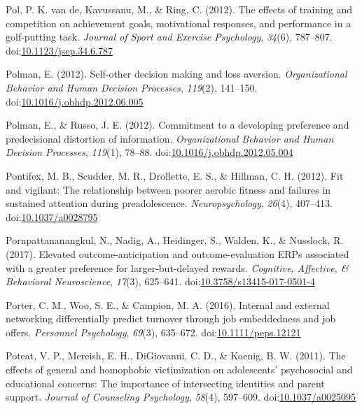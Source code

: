 \documentclass[english,man]{apa6}
\theoremstyle{definition}
\theoremstyle{definition}
\theoremstyle{definition}
\theoremstyle{remark}
\begin{document}
\hypertarget{ref-VandePolP2012}{}
Pol, P. K. van de, Kavussanu, M., \& Ring, C. (2012). The effects of
training and competition on achievement goals, motivational responses,
and performance in a golf-putting task. \emph{Journal of Sport and
Exercise Psychology}, \emph{34}(6), 787--807.
doi:\href{https://doi.org/10.1123/jsep.34.6.787}{10.1123/jsep.34.6.787}

\hypertarget{ref-Polman2012}{}
Polman, E. (2012). Self-other decision making and loss aversion.
\emph{Organizational Behavior and Human Decision Processes},
\emph{119}(2), 141--150.
doi:\href{https://doi.org/10.1016/j.obhdp.2012.06.005}{10.1016/j.obhdp.2012.06.005}

\hypertarget{ref-Polman2012a}{}
Polman, E., \& Russo, J. E. (2012). Commitment to a developing
preference and predecisional distortion of information.
\emph{Organizational Behavior and Human Decision Processes},
\emph{119}(1), 78--88.
doi:\href{https://doi.org/10.1016/j.obhdp.2012.05.004}{10.1016/j.obhdp.2012.05.004}

\hypertarget{ref-Pontifex2012}{}
Pontifex, M. B., Scudder, M. R., Drollette, E. S., \& Hillman, C. H.
(2012). Fit and vigilant: The relationship between poorer aerobic
fitness and failures in sustained attention during preadolescence.
\emph{Neuropsychology}, \emph{26}(4), 407--413.
doi:\href{https://doi.org/10.1037/a0028795}{10.1037/a0028795}

\hypertarget{ref-Pornpattananangkul2017}{}
Pornpattananangkul, N., Nadig, A., Heidinger, S., Walden, K., \&
Nusslock, R. (2017). Elevated outcome-anticipation and
outcome-evaluation ERPs associated with a greater preference for
larger-but-delayed rewards. \emph{Cognitive, Affective, \& Behavioral
Neuroscience}, \emph{17}(3), 625--641.
doi:\href{https://doi.org/10.3758/s13415-017-0501-4}{10.3758/s13415-017-0501-4}

\hypertarget{ref-Porter2016}{}
Porter, C. M., Woo, S. E., \& Campion, M. A. (2016). Internal and
external networking differentially predict turnover through job
embeddedness and job offers. \emph{Personnel Psychology}, \emph{69}(3),
635--672.
doi:\href{https://doi.org/10.1111/peps.12121}{10.1111/peps.12121}

\hypertarget{ref-Poteat2011}{}
Poteat, V. P., Mereish, E. H., DiGiovanni, C. D., \& Koenig, B. W.
(2011). The effects of general and homophobic victimization on
adolescents' psychosocial and educational concerns: The importance of
intersecting identities and parent support. \emph{Journal of Counseling
Psychology}, \emph{58}(4), 597--609.
doi:\href{https://doi.org/10.1037/a0025095}{10.1037/a0025095}
\end{document}
